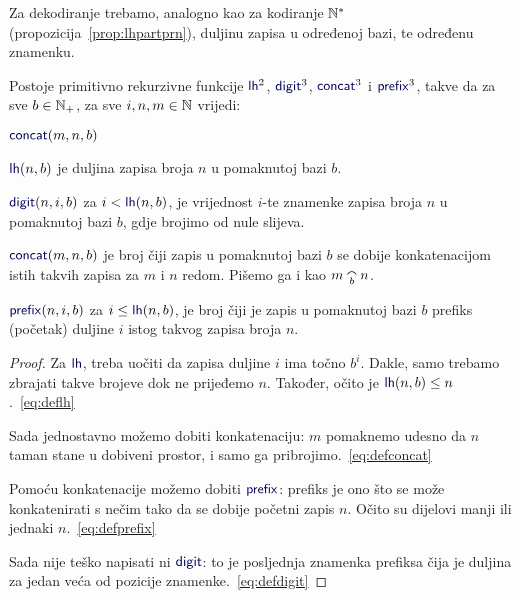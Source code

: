 Za dekodiranje trebamo, analogno kao za kodiranje ${\mathbb N}^*$ (propozicija~\ref{prop:lhpartprn}), duljinu zapisa u određenoj bazi, te određenu znamenku. %

\begin{lema}\label{lm:ldcpprn}
Postoje primitivno rekurzivne funkcije $\f{lh}^2$\!, $\f{digit}^3$\!, $\f{concat}^3$ i $\f{prefix}^3$, takve da za sve $b\in{\mathbb N}_+$, za sve $i,n,m\in{\mathbb N}$ vrijedi:
\begin{labeling}{$\f{concat}(m,n,b)$}
    \item[$\f{lh}(n,b)$] je duljina zapisa broja $n$ u pomaknutoj bazi $b$. \item[$\f{digit}(n,i,b)$] za $i<\f{lh}(n,b)$, je vrijednost $i$-te znamenke zapisa broja $n$ u pomaknutoj bazi $b$, gdje brojimo od nule slijeva.
    \item[$\f{concat}(m,n,b)$] je broj čiji zapis u pomaknutoj bazi $b$ se dobije konkatenacijom istih takvih zapisa za $m$ i $n$ redom. Pišemo ga i kao $m\conc bn$.
    \item[$\f{prefix}(n,i,b)$] za $i\le\f{lh}(n,b)$, je broj čiji je zapis u pomaknutoj bazi $b$ prefiks (početak) duljine $i$ istog takvog zapisa broja $n$.
\end{labeling}
\end{lema}
\begin{proof}
Za $\f{lh}$, treba uočiti da zapisa duljine $i$ ima točno $b^i$. Dakle, samo trebamo zbrajati takve brojeve dok ne prijeđemo $n$. Također, očito je $\f{lh}(n,b)\le n$.~\eqref{eq:deflh}

Sada jednostavno možemo dobiti konkatenaciju: $m$ pomaknemo udesno da $n$ taman stane u dobiveni prostor, i samo ga pribrojimo.~\eqref{eq:defconcat}

Pomoću konkatenacije možemo dobiti $\f{prefix}$: prefiks je ono što se može konkatenirati s nečim tako da se dobije početni zapis $n$. Očito su dijelovi manji ili jednaki $n$.~\eqref{eq:defprefix}

Sada nije teško napisati ni $\f{digit}$: to je posljednja znamenka prefiksa čija je duljina za jedan veća od pozicije znamenke.~\eqref{eq:defdigit}
\end{proof}

